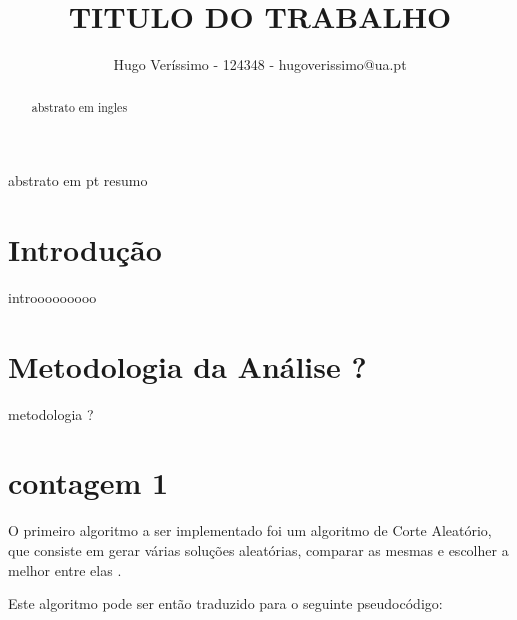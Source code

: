 \documentclass[mirror, portugues]{revdetua}
\begin{document}

\title{TITULO DO TRABALHO}
\author{Hugo Veríssimo - 124348 - hugoverissimo@ua.pt}
\maketitle

\begin{abstract}
abstrato em ingles
\end{abstract}

\begin{resumo}
abstrato em pt resumo
\end{resumo}


\section{Introdução}

introoooooooo

\section{Metodologia da Análise ?}

metodologia ?

\section{contagem 1}

O primeiro algoritmo a ser implementado foi um algoritmo de Corte Aleatório, que consiste em gerar várias soluções aleatórias, comparar as mesmas e escolher a melhor entre elas \cite{EX69}.

Este algoritmo pode ser então traduzido para o seguinte pseudocódigo:
\end{document}
